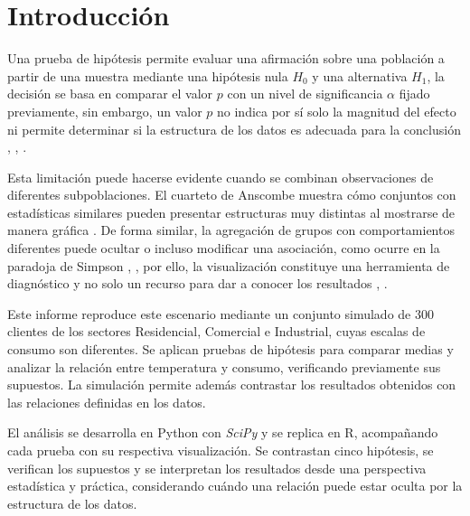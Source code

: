 \section{Introducción}
    Una prueba de hipótesis permite evaluar una afirmación sobre una población 
    a partir de una muestra mediante una hipótesis nula $H_0$ y una alternativa
    $H_1$, la decisión se basa en comparar el valor $p$ con un nivel de
    significancia $\alpha$ fijado previamente, sin embargo, un valor $p$ no 
    indica por sí solo la magnitud del efecto ni permite determinar si la 
    estructura de los datos es adecuada para la conclusión \cite{montgomery2020design},
    \cite{walpole2012probabilidad}, \cite{wasserstein2016asa}.

    \vspace{10pt}

    Esta limitación puede hacerse evidente cuando se combinan observaciones de
    diferentes subpoblaciones. El cuarteto de Anscombe muestra cómo conjuntos con
    estadísticas similares pueden presentar estructuras muy distintas al
    mostrarse de manera gráfica \cite{anscombe1973graphs}. De forma similar, la
    agregación de grupos con comportamientos diferentes puede ocultar o incluso
    modificar una asociación, como ocurre en la paradoja de Simpson
    \cite{kievit2013simpson}, \cite{simpson1951interpretation}, por ello, la
    visualización constituye una herramienta de diagnóstico y no solo un recurso
    para dar a conocer los resultados \cite{few2012show}, 
    \cite{castro2026visualizacion}.

    \vspace{10pt}

    Este informe reproduce este escenario mediante un conjunto simulado de 300
    clientes de los sectores Residencial, Comercial e Industrial, cuyas escalas
    de consumo son diferentes. Se aplican pruebas de hipótesis para comparar
    medias y analizar la relación entre temperatura y consumo, verificando
    previamente sus supuestos. La simulación permite además contrastar los
    resultados obtenidos con las relaciones definidas en los datos.

    \vspace{10pt}

    El análisis se desarrolla en Python con \textit{SciPy} y se replica en R,
    acompañando cada prueba con su respectiva visualización. Se contrastan
    cinco hipótesis, se verifican los supuestos y se interpretan los resultados
    desde una perspectiva estadística y práctica, considerando cuándo una
    relación puede estar oculta por la estructura de los datos.
